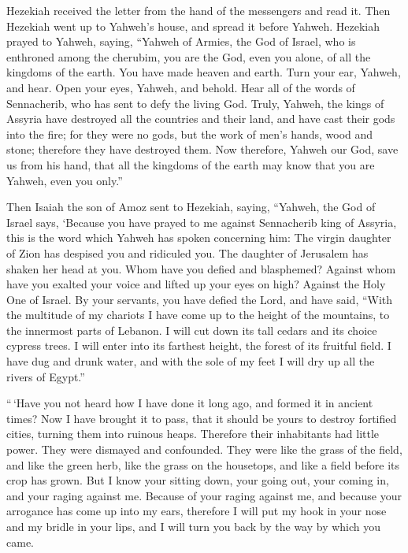  Hezekiah received the letter from the hand of the
messengers and read it. Then Hezekiah went up to Yahweh's house, and
spread it before Yahweh.  Hezekiah prayed to Yahweh,
saying,  ``Yahweh of Armies, the God of Israel, who is
enthroned among the cherubim, you are the God, even you alone, of all
the kingdoms of the earth. You have made heaven and earth. 
Turn your ear, Yahweh, and hear. Open your eyes, Yahweh, and behold.
Hear all of the words of Sennacherib, who has sent to defy the living
God.  Truly, Yahweh, the kings of Assyria have destroyed
all the countries and their land,  and have cast their gods
into the fire; for they were no gods, but the work of men's hands, wood
and stone; therefore they have destroyed them.  Now
therefore, Yahweh our God, save us from his hand, that all the kingdoms
of the earth may know that you are Yahweh, even you only.''

 Then Isaiah the son of Amoz sent to Hezekiah, saying,
``Yahweh, the God of Israel says, `Because you have prayed to me against
Sennacherib king of Assyria,  this is the word which Yahweh
has spoken concerning him: The virgin daughter of Zion has despised you
and ridiculed you. The daughter of Jerusalem has shaken her head at you.
 Whom have you defied and blasphemed? Against whom have you
exalted your voice and lifted up your eyes on high? Against the Holy One
of Israel.  By your servants, you have defied the Lord, and
have said, ``With the multitude of my chariots I have come up to the
height of the mountains, to the innermost parts of Lebanon. I will cut
down its tall cedars and its choice cypress trees. I will enter into its
farthest height, the forest of its fruitful field.  I have
dug and drunk water, and with the sole of my feet I will dry up all the
rivers of Egypt.''

 ``\,`Have you not heard how I have done it long ago, and
formed it in ancient times? Now I have brought it to pass, that it
should be yours to destroy fortified cities, turning them into ruinous
heaps.  Therefore their inhabitants had little power. They
were dismayed and confounded. They were like the grass of the field, and
like the green herb, like the grass on the housetops, and like a field
before its crop has grown.  But I know your sitting down,
your going out, your coming in, and your raging against me.
 Because of your raging against me, and because your
arrogance has come up into my ears, therefore I will put my hook in your
nose and my bridle in your lips, and I will turn you back by the way by
which you came.


